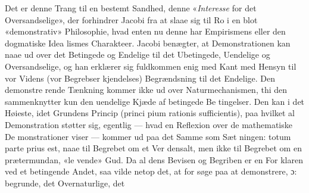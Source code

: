 \documentclass[12pt,a4paper]{book}
\begin{document}
Det er denne Trang til en bestemt Sandhed, denne
«\emph{Interesse} for det Oversandselige», der forhindrer Jacobi fra
at slaae sig til Ro i en blot «demonstrativ» Philosophie, hvad
enten nu denne har Empirismens eller den dogmatiske Idea\-%
lismes Charakteer. Jacobi benægter, at Demonstrationen kan
naae ud over det Betingede og Endelige til det Ubetingede,
Uendelige og Oversandselige, og han erklærer sig fuldkommen
enig med Kant med Hensyn til vor Videns (vor Begrebser\-%
kjendelses) Begrændsning til det Endelige. Den demonstre\-%
rende Tænkning kommer ikke ud over Naturmechanismen, thi
den sammenknytter kun den uendelige Kjæde af betingede Be\-%
tingelser. Den kan i det Høieste, idet Grundens Princip (princi\-%
pium rationis sufficientis), paa hvilket al Demonstration støtter
sig, egentlig --- hvad en Reflexion over de mathematiske De\-%
monstrationer viser --- kommer ud paa det Samme som Sæt\-%
ningen: totum parte prius est, naae til Begrebet om et Ver\-%
densalt, men ikke til Begrebet om en prætermundan, «le\-%
vende» Gud. Da al dens Bevisen og Begriben er en For\-%
klaren ved et betingende Andet, saa vilde netop det, at for\-%
søge paa at demonstrere, ɔ: begrunde, det Overnaturlige, det
\end{document}
